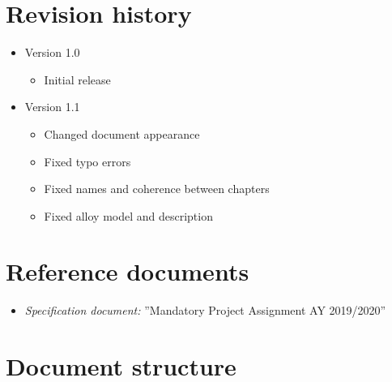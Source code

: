 		\section{Revision history}
			\begin{itemize}
				\item Version 1.0
					\begin{itemize}
						\item Initial release
					\end{itemize}
				\item Version 1.1
					\begin{itemize}
						\item Changed document appearance
						\item Fixed typo errors
						\item Fixed names and coherence between chapters
						\item Fixed alloy model and description
					\end{itemize}
			\end{itemize}
		\section{Reference documents}
			\begin{itemize}
				\item \textit{Specification document:} ''Mandatory Project Assignment AY 2019/2020''
			\end{itemize}
		\section{Document structure}

